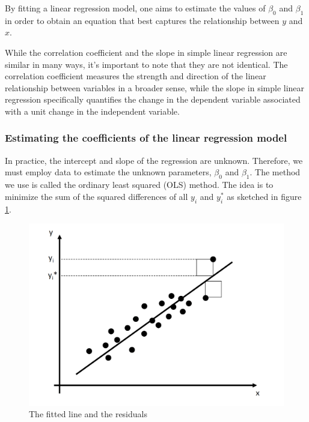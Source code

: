 \documentclass[
  12pt,
  oneside]{book}
\theoremstyle{definition}
\theoremstyle{definition}
\theoremstyle{definition}
\theoremstyle{definition}
\theoremstyle{remark}
\begin{document}
By fitting a linear regression model, one aims to estimate the values of \(\beta_0\) and \(\beta_1\) in order to obtain an equation that best captures the relationship between \(y\) and \(x\).

While the correlation coefficient and the slope in simple linear regression are similar in many ways, it's important to note that they are not identical. The correlation coefficient measures the strength and direction of the linear relationship between variables in a broader sense, while the slope in simple linear regression specifically quantifies the change in the dependent variable associated with a unit change in the independent variable.

\hypertarget{estimating-the-coefficients-of-the-linear-regression-model}{%
\subsubsection{Estimating the coefficients of the linear regression model}\label{estimating-the-coefficients-of-the-linear-regression-model}}

In practice, the intercept and slope of the regression are unknown. Therefore, we must employ data to estimate the unknown parameters, \(\beta_0\) and \(\beta_1\).
The method we use is called the ordinary least squared (OLS) method. The idea is to minimize the sum of the squared differences of all \(y_i\) and \(y_i^*\) as sketched in figure \ref{fig:regressionols}.

\begin{figure}

{\centering \includegraphics[width=18.85in]{fig/regression_ols} 

}

\caption{The fitted line and the residuals}\label{fig:regressionols}
\end{figure}
\end{document}

